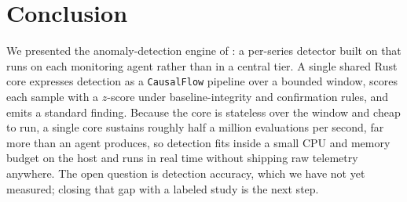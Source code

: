 \section{Conclusion}
\label{sec:conclusion}

We presented the anomaly-detection engine of \sysname: a per-series detector built
on \dc{} that runs on each monitoring agent rather than in a central tier. A single
shared Rust core expresses detection as a \texttt{CausalFlow} pipeline over a
bounded window, scores each sample with a $z$-score under baseline-integrity and
confirmation rules, and emits a standard finding. Because the core is stateless over
the window and cheap to run, a single core sustains roughly half a million
evaluations per second, far more than an agent produces, so detection fits inside a
small CPU and memory budget on the host and runs in real time without shipping raw
telemetry anywhere. The open question is detection accuracy, which we have not yet
measured; closing that gap with a labeled study is the next step.
